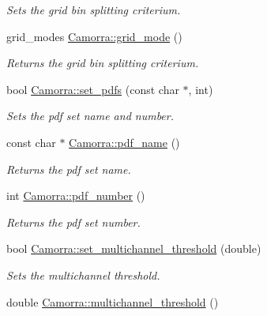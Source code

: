 \begin{DoxyCompactItemize}
\begin{DoxyCompactList}\small\item\em Sets the grid bin splitting criterium. \end{DoxyCompactList}\item 
\hypertarget{a00831_a73aef909f3351e47a5947caaaa248c96}{
grid\_\-modes \hyperlink{a00831_a73aef909f3351e47a5947caaaa248c96}{Camorra::grid\_\-mode} ()}
\label{a00831_a73aef909f3351e47a5947caaaa248c96}

\begin{DoxyCompactList}\small\item\em Returns the grid bin splitting criterium. \end{DoxyCompactList}\item 
bool \hyperlink{a00831_ac368b117d85d0b8799272b483b14c791}{Camorra::set\_\-pdfs} (const char $\ast$, int)
\begin{DoxyCompactList}\small\item\em Sets the pdf set name and number. \end{DoxyCompactList}\item 
\hypertarget{a00831_a2f7c6820df8813be79a94788715db133}{
const char $\ast$ \hyperlink{a00831_a2f7c6820df8813be79a94788715db133}{Camorra::pdf\_\-name} ()}
\label{a00831_a2f7c6820df8813be79a94788715db133}

\begin{DoxyCompactList}\small\item\em Returns the pdf set name. \end{DoxyCompactList}\item 
\hypertarget{a00831_a50db3e81e876becba1a5a0c20cef098e}{
int \hyperlink{a00831_a50db3e81e876becba1a5a0c20cef098e}{Camorra::pdf\_\-number} ()}
\label{a00831_a50db3e81e876becba1a5a0c20cef098e}

\begin{DoxyCompactList}\small\item\em Returns the pdf set number. \end{DoxyCompactList}\item 
bool \hyperlink{a00831_a3d412d1902455f35c2fbd020ed8651f5}{Camorra::set\_\-multichannel\_\-threshold} (double)
\begin{DoxyCompactList}\small\item\em Sets the multichannel threshold. \end{DoxyCompactList}\item 
\hypertarget{a00831_ac61ace3ceae1851c72e6e97d16cfdeb9}{
double \hyperlink{a00831_ac61ace3ceae1851c72e6e97d16cfdeb9}{Camorra::multichannel\_\-threshold} ()}
\label{a00831_ac61ace3ceae1851c72e6e97d16cfdeb9}


\end{DoxyCompactItemize}
